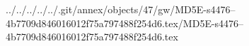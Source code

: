 ../../../../../.git/annex/objects/47/gw/MD5E-s4476--4b7709d846016012f75a797488f254d6.tex/MD5E-s4476--4b7709d846016012f75a797488f254d6.tex